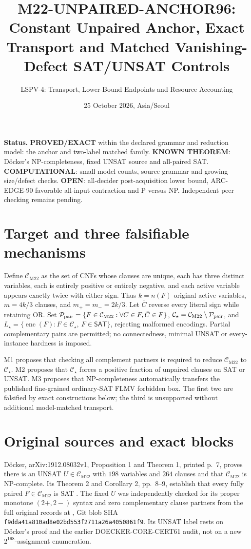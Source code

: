 \documentclass[11pt]{article}
\title{M22-UNPAIRED-ANCHOR96: Constant Unpaired Anchor, Exact Transport and Matched Vanishing-Defect SAT/UNSAT Controls}
\author{LSPV-4: Transport, Lower-Bound Endpoints and Resource Accounting}
\date{25 October 2026, Asia/Seoul}
\newcommand{\CM}{\mathcal C_{\mathrm{M22}}}
\newcommand{\CS}{\mathcal C_{\star}}
\newcommand{\SAT}{\mathsf{SAT}}
\begin{document}
\maketitle
\noindent\textbf{Status.} \textbf{PROVED/EXACT} within the declared grammar and reduction model: the anchor and two-label matched family. \textbf{KNOWN THEOREM}: D\"ocker's NP-completeness, fixed UNSAT source and all-paired SAT. \textbf{COMPUTATIONAL}: small model counts, source grammar and growing size/defect checks. \textbf{OPEN}: all-decider post-acquisition lower bound, ARC-EDGE-90 favorable all-input contraction and P versus NP. Independent peer checking remains pending.

\section{Target and three falsifiable mechanisms}
Define \(\CM\) as the set of CNFs whose clauses are unique, each has three distinct variables, each is entirely positive or entirely negative, and each active variable appears exactly twice with either sign. Thus \(k=n(F)\) original active variables, \(m=4k/3\) clauses, and \(m_+=m_-=2k/3\). Let \(\bar C\) reverse every literal sign while retaining OR. Set \(\mathcal P_{\rm pair}=\{F\in\CM:\forall C\in F,\bar C\in F\}\), \(\CS=\CM\setminus\mathcal P_{\rm pair}\), and \(L_\star=\{\operatorname{enc}(F):F\in\CS,\ F\in\SAT\}\), rejecting malformed encodings. Partial complementary pairs are permitted; no connectedness, minimal UNSAT or every-instance hardness is imposed.

M1 proposes that checking all complement partners is required to reduce \(\CM\) to \(\CS\). M2 proposes that \(\CS\) forces a positive fraction of unpaired clauses on SAT or UNSAT. M3 proposes that NP-completeness automatically transfers the published fine-grained ordinary-SAT FLMV forbidden box. The first two are falsified by exact constructions below; the third is unsupported without additional model-matched transport.

\section{Original sources and exact blocks}
D\"ocker, arXiv:1912.08032v1, Proposition 1 and Theorem 1, printed p.~7, proves there is an UNSAT \(U\in\CM\) with \(198\) variables and \(264\) clauses and that \(\CM\) is NP-complete. Its Theorem 2 and Corollary 2, pp.~8--9, establish that every fully paired \(F\in\CM\) is SAT \cite{Docker}. The fixed \(U\) was independently checked for its proper monotone \((2+,2-)\) syntax and zero complementary clause partners from the full original records at , Git blob SHA \texttt{f9dda41a810ad8e02bd553f2711a26a4050861f9}. Its UNSAT label rests on D\"ocker's proof and the earlier DOECKER-CORE-CERT61 audit, not on a new \(2^{198}\)-assignment enumeration.
\end{document}
